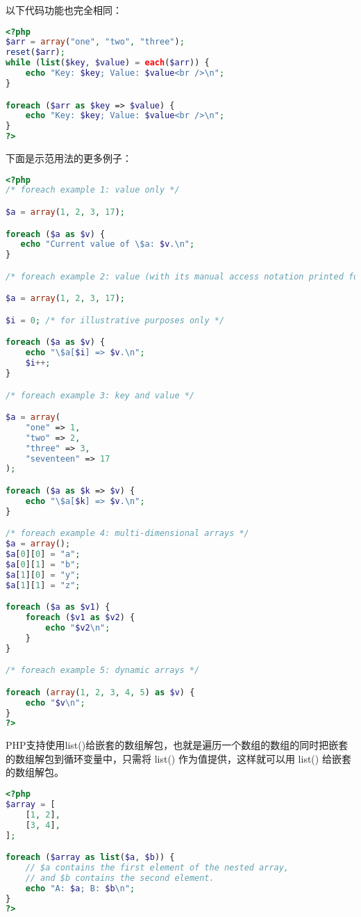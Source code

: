 以下代码功能也完全相同：

\begin{lstlisting}[language=PHP]
<?php
$arr = array("one", "two", "three");
reset($arr);
while (list($key, $value) = each($arr)) {
    echo "Key: $key; Value: $value<br />\n";
}

foreach ($arr as $key => $value) {
    echo "Key: $key; Value: $value<br />\n";
}
?>
\end{lstlisting}


下面是示范用法的更多例子：

\begin{lstlisting}[language=PHP]
<?php
/* foreach example 1: value only */

$a = array(1, 2, 3, 17);

foreach ($a as $v) {
   echo "Current value of \$a: $v.\n";
}

/* foreach example 2: value (with its manual access notation printed for illustration) */

$a = array(1, 2, 3, 17);

$i = 0; /* for illustrative purposes only */

foreach ($a as $v) {
    echo "\$a[$i] => $v.\n";
    $i++;
}

/* foreach example 3: key and value */

$a = array(
    "one" => 1,
    "two" => 2,
    "three" => 3,
    "seventeen" => 17
);

foreach ($a as $k => $v) {
    echo "\$a[$k] => $v.\n";
}

/* foreach example 4: multi-dimensional arrays */
$a = array();
$a[0][0] = "a";
$a[0][1] = "b";
$a[1][0] = "y";
$a[1][1] = "z";

foreach ($a as $v1) {
    foreach ($v1 as $v2) {
        echo "$v2\n";
    }
}

/* foreach example 5: dynamic arrays */

foreach (array(1, 2, 3, 4, 5) as $v) {
    echo "$v\n";
}
?>
\end{lstlisting}



PHP支持使用list()给嵌套的数组解包，也就是遍历一个数组的数组的同时把嵌套的数组解包到循环变量中，只需将 list() 作为值提供，这样就可以用 list() 给嵌套的数组解包。

\begin{lstlisting}[language=PHP]
<?php
$array = [
    [1, 2],
    [3, 4],
];

foreach ($array as list($a, $b)) {
    // $a contains the first element of the nested array,
    // and $b contains the second element.
    echo "A: $a; B: $b\n";
}
?>
\end{lstlisting}


